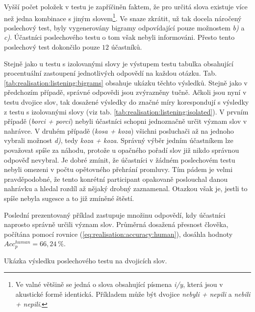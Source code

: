 Vyšší počet položek v testu je zapříčiněn faktem, že pro určitá slova existuje více než jedna kombinace s jiným slovem\footnote{Ve valné většině se jedná o slova obsahující písmena \textit{i/y}, která jsou v akustické formě identická. Příkladem může být dvojice \textit{nebyli + nepili} a \textit{nebili + nepili}.}. Ve snaze zkrátit, už tak docela náročený poslechový test, byly vygenerovány bigramy odpovídající pouze možnostem \textit{b)} a \textit{c)}. Účastníci poslechového testu o tom však nebyli informováni. Přesto tento poslechový test dokončilo pouze $12$ účastníků.

Stejně jako u testu s izolovanými slovy je výstupem testu tabulka obsahující procentuální zastoupení jednotlivých odpovědí na každou otázku. Tab. \ref{tab:realisation:listening:bigrams} obsahuje ukázku těchto výsledků. Stejně jako v předchozím případě, správné odpovědi jsou zvýrazněny tučně. Ačkoli jsou nyní v testu dvojice slov, tak dosažené výsledky do značné míry korespondují s výsledky z testu s izolovanými slovy (viz tab. \ref{tab:realisation:listening:isolated}). V prvním případě (\textit{borci + porci}) nebyli účastníci schopni jednoznačně určit význam slov v nahrávce. V druhém případě (\textit{kosa + koza}) všichni posluchači až na jednoho vybrali možnost \textit{d)}, tedy \textit{koza + koza}. Správný výběr jedním účastníkem lze považovat spíše za náhodu, protože u opačného pořadí slov již nikdo správnou odpověď nevybral. Je dobré zmínit, že účastníci v žádném poslechovém testu nebyli omezeni v počtu opětovného přehrání promluvy. Tím pádem je velmi pravděpodobné, že tento konrétní participant opakovaně poslouchal danou nahrávku a hledal rozdíl až nějaký drobný zaznamenal. Otazkou však je, jestli to spíše nebyla sugesce a to již zmíněné štěstí.

Poslední prezentovaný příklad zastupuje množinu odpovědí, kdy účastníci naprosto správně určili význam slov. Průměrná dosažená přesnost člověka, počítána pomocí rovnice (\ref{eq:realisation:accuracy:human}), dosáhla hodnoty $Acc_{p}^{human} = 66,24\ \%$.

\begin{table}[htpb]
  \centering
  \def\arraystretch{1.5}
  \caption{Ukázka výsledku poslechového testu na dvojicích slov.}
  \label{tab:realisation:listening:bigrams}
\end{table}

